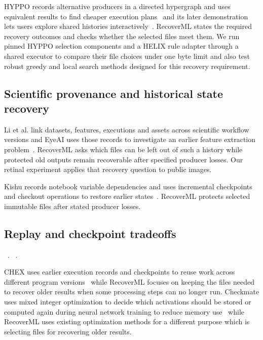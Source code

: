 HYPPO records alternative producers in a directed hypergraph and uses equivalent results to find cheaper execution plans~\cite{hyppo} and its later demonstration lets users explore shared histories interactively~\cite{hyppo2025}. RecoverML states the required recovery outcomes and checks whether the selected files meet them. We run pinned HYPPO selection components and a HELIX rule adapter through a shared executor to compare their file choices under one byte limit and also test robust greedy and local search methods designed for this recovery requirement.

\subsection{Scientific provenance and historical state recovery}

Li et al. link datasets, features, executions and assets across scientific workflow versions and EyeAI uses those records to investigate an earlier feature extraction problem~\cite{derivaml}. RecoverML asks which files can be left out of such a history while protected old outputs remain recoverable after specified producer losses. Our retinal experiment applies that recovery question to public images.

Kishu records notebook variable dependencies and uses incremental checkpoints and checkout operations to restore earlier states~\cite{kishu}. RecoverML protects selected immutable files after stated producer losses.

\subsection{Replay and checkpoint tradeoffs}

~\cite{bhattacherjee2015versioning}. ~\cite{vartak2018mistique}. 

CHEX uses earlier execution records and checkpoints to reuse work across different program versions~\cite{chex} while RecoverML focuses on keeping the files needed to recover older results when some processing steps can no longer run. Checkmate uses mixed integer optimization to decide which activations should be stored or computed again during neural network training to reduce memory use~\cite{checkmate} while RecoverML uses existing optimization methods for a different purpose which is selecting files for recovering older results.

